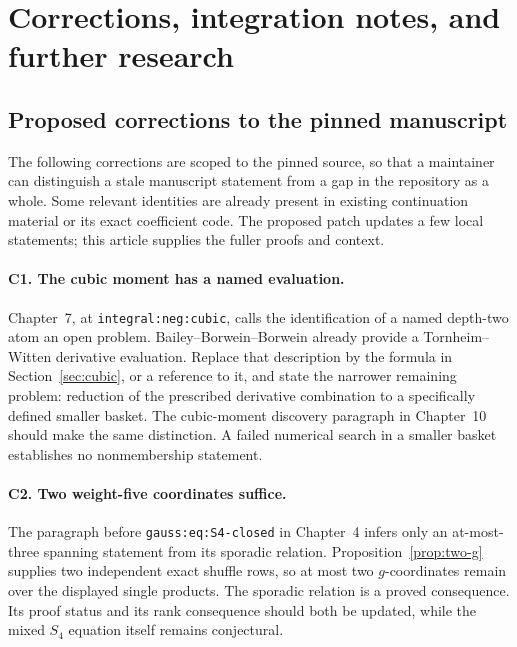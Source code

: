 \section{Corrections, integration notes, and further research}
\label{sec:corrections}

\subsection{Proposed corrections to the pinned manuscript}

The following corrections are scoped to the pinned source, so that
a maintainer can distinguish a stale manuscript statement from a gap
in the repository as a whole. Some relevant identities are already
present in existing continuation material or its exact coefficient
code. The proposed patch updates a few local statements; this article
supplies the fuller proofs and context.

\paragraph{C1. The cubic moment has a named evaluation.}
Chapter~7, at \texttt{integral:neg:cubic}, calls the identification of a
named depth-two atom an open problem. Bailey--Borwein--Borwein
\cite[Theorem~6]{BBB} already provide a Tornheim--Witten derivative
evaluation. Replace that description by the formula in
Section~\ref{sec:cubic}, or a reference to it, and state the narrower
remaining problem: reduction of the prescribed derivative combination
to a specifically defined smaller basket. The cubic-moment discovery
paragraph in Chapter~10 should make the same distinction.
A failed numerical search in a smaller basket establishes no
nonmembership statement.

\paragraph{C2. Two weight-five coordinates suffice.}
The paragraph before \texttt{gauss:eq:S4-closed} in Chapter~4 infers
only an at-most-three spanning statement from its sporadic relation.
Proposition~\ref{prop:two-g} supplies two independent exact shuffle rows,
so at most two \(g\)-coordinates remain over the displayed single
products. The sporadic relation is a proved consequence. Its proof
status and its rank consequence should both be updated, while the
mixed \(S_4\) equation itself remains conjectural.

